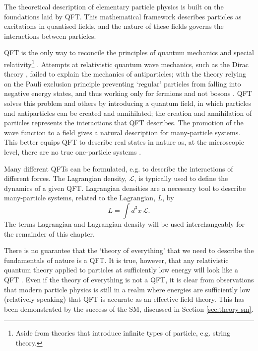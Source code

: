 
The theoretical description of elementary particle physics is built on the
foundations laid by \ac{QFT}. This mathematical framework describes particles as
excitations in quantised fields, and the nature of these fields governs the
interactions between particles.

\ac{QFT} is the only way to reconcile the principles of quantum mechanics and
special relativity\footnote{
  Aside from theories that introduce infinite types of particle, e.g. string
  theory.
}
\cite{Weinberg1995}. Attempts at relativistic quantum wave mechanics, such as
the Dirac theory \cite{Dirac1930}, failed to explain the mechanics of
antiparticles; with the theory relying on the Pauli exclusion principle
\cite{Pauli1925} preventing `regular' particles from falling into negative
energy states, and thus working only for fermions and not bosons
\cite[p.14]{Weinberg1995}.  \ac{QFT} solves this problem and others by
introducing a quantum field, in which particles and antiparticles can be created
and annihilated; the creation and annihilation of particles represents the
interactions that \ac{QFT} describes.
The promotion of the wave function to a field gives a natural description for
many-particle systems. This better equips QFT to describe real states in nature
as, at the microscopic level, there are no true one-particle systems
\cite{Weisskopf1981}.

\newcommand\Lden{\ensuremath{\mathcal{L}}\xspace}
Many different \acp{QFT} can be formulated, e.g. to describe the interactions
of different forces. The Lagrangian density, \Lden, is typically used to define
the dynamics of a given \ac{QFT}. Lagrangian densities are a necessary tool to
describe many-particle systems, related to the Lagrangian, $L$, by
%
\begin{equation*}
  L = \int d^3x \, \Lden .
\end{equation*}
The terms Lagrangian and Lagrangian density will be used interchangeably for the
remainder of this chapter.

There is no guarantee that the `theory of everything' that we need to describe
the fundamentals of nature is a \ac{QFT}. It is true, however, that any
relativistic quantum theory applied to particles at sufficiently low energy will
look like a \ac{QFT} \cite{Weinberg1995}. Even if the theory of everything is
not a \ac{QFT}, it is clear from observations that modern particle physics is
still in a realm where energies are sufficiently low (relatively speaking) that
\ac{QFT} is accurate as an effective field theory. This has been demonstrated by
the success of the \ac{SM}, discussed in Section \ref{sec:theory-sm}.

